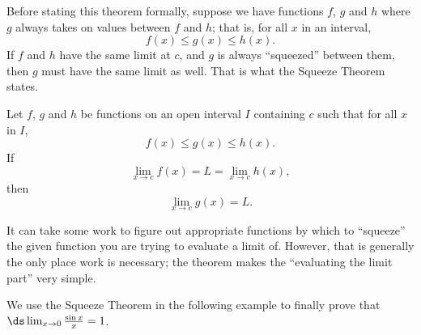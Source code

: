 Before stating this theorem formally, suppose we have functions $f$, $g$ and $h$ where $g$ always takes on values between $f$ and $h$; that is, for all $x$ in an interval, $$f(x) \leq g(x) \leq h(x).$$ If $f$ and $h$ have the same limit at $c$, and $g$  is always ``squeezed'' between them, then $g$ must have the same limit as well. That is what the Squeeze Theorem states.

{Let $f$, $g$ and $h$ be functions on an open interval $I$ containing $c$ such that for all $x$ in $I$, $$f(x)\leq g(x) \leq h(x).$$ If $$\lim_{x\to c} f(x) = L = \lim_{x\to c} h(x),$$ then $$\lim_{x\to c} g(x) = L.$$
}

It can take some work to figure out appropriate functions by which to ``squeeze'' the given function you are trying to evaluate a limit of. However, that is generally the only place work is necessary; the theorem makes the ``evaluating the limit part'' very simple. 

We use the Squeeze Theorem in the following example to finally prove that $\ds \lim_{x\to 0} \frac{\sin x}{x} = 1$.\\

